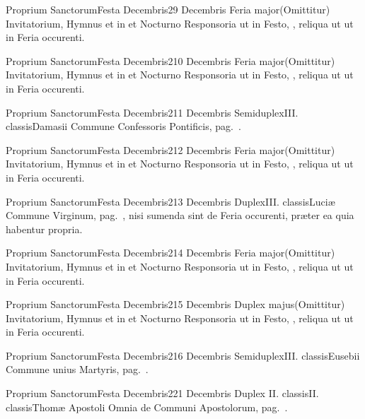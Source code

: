 \documentclass[liber-responsorialis.tex]{subfiles}
\begin{document}
	{Proprium Sanctorum}{Festa Decembris}{2}{9 Decembris}
	{Feria major}{(Omittitur)}{}
	{Invitatorium, Hymnus et in  et  Nocturno Responsoria ut in Festo, \pageref{M-1208}, reliqua ut ut in Feria occurenti.}
	{}

	{Proprium Sanctorum}{Festa Decembris}{2}{10 Decembris}
	{Feria major}{(Omittitur)}{}
	{Invitatorium, Hymnus et in  et  Nocturno Responsoria ut in Festo, \pageref{M-1208}, reliqua ut ut in Feria occurenti.}
	{}

	{Proprium Sanctorum}{Festa Decembris}{2}{11 Decembris}
	{Semiduplex}{III. classis}{Damasii}
	{Commune Confessoris Pontificis, pag.\ \pageref{M-COPO}.}
	{}

	{Proprium Sanctorum}{Festa Decembris}{2}{12 Decembris}
	{Feria major}{(Omittitur)}{}
	{Invitatorium, Hymnus et in  et  Nocturno Responsoria ut in Festo, \pageref{M-1208}, reliqua ut ut in Feria occurenti.}
	{}

	{Proprium Sanctorum}{Festa Decembris}{2}{13 Decembris}
	{Duplex}{III. classis}{Luciæ}
	{Commune Virginum, pag.\ \pageref{M-MU}, nisi sumenda sint de Feria occurenti, præter ea quia habentur propria.}
	{}

	{Proprium Sanctorum}{Festa Decembris}{2}{14 Decembris}
	{Feria major}{(Omittitur)}{}
	{Invitatorium, Hymnus et in  et  Nocturno Responsoria ut in Festo, \pageref{M-1208}, reliqua ut ut in Feria occurenti.}
	{}

	{Proprium Sanctorum}{Festa Decembris}{2}{15 Decembris}
	{Duplex majus}{(Omittitur)}{}
	{Invitatorium, Hymnus et in  et  Nocturno Responsoria ut in Festo, \pageref{M-1208}, reliqua ut ut in Feria occurenti.}
	{}

	{Proprium Sanctorum}{Festa Decembris}{2}{16 Decembris}
	{Semiduplex}{III. classis}{Eusebii}
	{Commune unius Martyris, pag.\ \pageref{M-UMEX}.}
	{}

	{Proprium Sanctorum}{Festa Decembris}{2}{21 Decembris}
	{Duplex II. classis}{II. classis}{Thomæ Apostoli}
	{Omnia de Communi Apostolorum, pag.\ \pageref{M-APEX}.}
	{}
	
\end{document}
